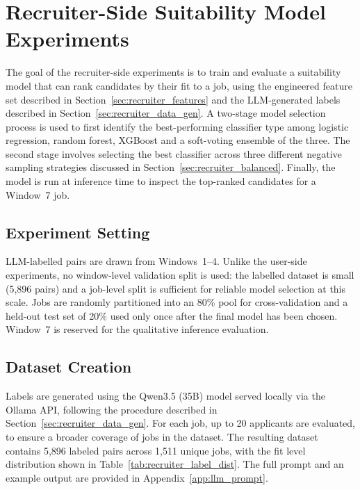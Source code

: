 \section{Recruiter-Side Suitability Model Experiments}
\label{sec:exp_recruiter}
The goal of the recruiter-side experiments is to train and evaluate a suitability model that can rank candidates by their fit to a job, using the engineered feature set described in Section~\ref{sec:recruiter_features} and the \gls{LLM}-generated labels described in Section~\ref{sec:recruiter_data_gen}. A two-stage model selection process is used to first identify the best-performing classifier type among logistic regression, random forest, XGBoost and a soft-voting ensemble of the three. The second stage involves selecting the best classifier across three different negative sampling strategies discussed in Section~\ref{sec:recruiter_balanced}. Finally, the model is run at inference time to inspect the top-ranked candidates for a Window~7 job.

\subsection{Experiment Setting}
\label{sec:exp_recruiter_setting}

LLM-labelled pairs are drawn from Windows~1--4. Unlike the user-side 
experiments, no window-level validation split is used: the labelled 
dataset is small (5{,}896 pairs) and a job-level split is sufficient 
for reliable model selection at this scale. Jobs are randomly 
partitioned into an 80\% pool for cross-validation and a held-out 
test set of 20\% used only once after the final model has been 
chosen. Window~7 is reserved for the qualitative inference evaluation.

\subsection{Dataset Creation}
\label{sec:exp_recruiter_datagen}

Labels are generated using the Qwen3.5 (35B) model served locally 
via the Ollama API, following the procedure described in 
Section~\ref{sec:recruiter_data_gen}. For each job, up to 20 applicants are evaluated, to ensure a broader coverage of jobs in the dataset. The resulting dataset contains 5,896 labeled pairs across 1,511 unique jobs, with the fit level distribution shown in Table~\ref{tab:recruiter_label_dist}. The full prompt 
and an example output are provided in Appendix~\ref{app:llm_prompt}.

